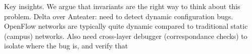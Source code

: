 
Key insights. We argue that invariants are the right way to think about this
problem. Delta over Anteater: need to detect dynamic configuration bugs.
OpenFlow networks are typically quite dynamic compared to traditional static
(campus) networks. Also need cross-layer debugger (correspondance checks) to isolate where the bug is,
and verify that

